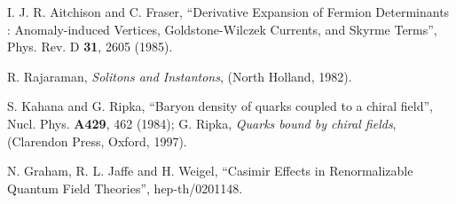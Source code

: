 \documentclass[a4paper,prd]{revtex4}
\begin{document}
\begin{thebibliography}{99}
  
 I. J. R.  Aitchison and C.  Fraser,  ``Derivative Expansion of
Fermion Determinants : Anomaly-induced Vertices,  Goldstone-Wilczek Currents,  
and Skyrme Terms'',  Phys.  Rev.  D {\bf 31}, 2605 (1985). 

 R. Rajaraman,  {\it Solitons and Instantons}, (North
Holland, 1982).

 S.  Kahana and G.  Ripka,  ``Baryon density of quarks coupled to 
a chiral field'',  Nucl.  Phys.  {\bf A429}, 462 (1984); G.  Ripka, 
{\it Quarks bound by chiral fields},  (Clarendon Press,  Oxford,  1997). 

 N. Graham, R. L. Jaffe and H. Weigel, ``Casimir Effects in
Renormalizable Quantum Field Theories'', hep-th/0201148.
 

\end{thebibliography}
\end{document}
